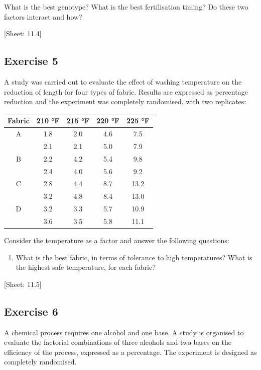 \documentclass[a4paper,12pt,oneside]{book}
\providecommand{\tightlist}{%
  \setlength{\itemsep}{0pt}\setlength{\parskip}{0pt}}
\begin{document}
What is the best genotype? What is the best fertilisation timing? Do these two factors interact and how?

{[}Sheet: 11.4{]}

\hypertarget{exercise-5-2}{%
\subsection{Exercise 5}\label{exercise-5-2}}

A study was carried out to evaluate the effect of washing temperature on the reduction of length for four types of fabric. Results are expressed as percentage reduction and the experiment was completely randomised, with two replicates:

\begin{longtable}[]{@{}ccccc@{}}
\toprule()
Fabric & 210 °F & 215 °F & 220 °F & 225 °F \\
\midrule()
\endhead
A & 1.8 & 2.0 & 4.6 & 7.5 \\
& 2.1 & 2.1 & 5.0 & 7.9 \\
B & 2.2 & 4.2 & 5.4 & 9.8 \\
& 2.4 & 4.0 & 5.6 & 9.2 \\
C & 2.8 & 4.4 & 8.7 & 13.2 \\
& 3.2 & 4.8 & 8.4 & 13.0 \\
D & 3.2 & 3.3 & 5.7 & 10.9 \\
& 3.6 & 3.5 & 5.8 & 11.1 \\
\bottomrule()
\end{longtable}

Consider the temperature as a factor and answer the following questions:

\begin{enumerate}
\def\labelenumi{\arabic{enumi}.}
\tightlist
\item
  What is the best fabric, in terms of tolerance to high temperatures? What is the highest safe temperature, for each fabric?
\end{enumerate}

{[}Sheet: 11.5{]}

\hypertarget{exercise-6-2}{%
\subsection{Exercise 6}\label{exercise-6-2}}

A chemical process requires one alcohol and one base. A study is organised to evaluate the factorial combinations of three alcohols and two bases on the efficiency of the process, expressed as a percentage. The experiment is designed as completely randomised.
\end{document}
